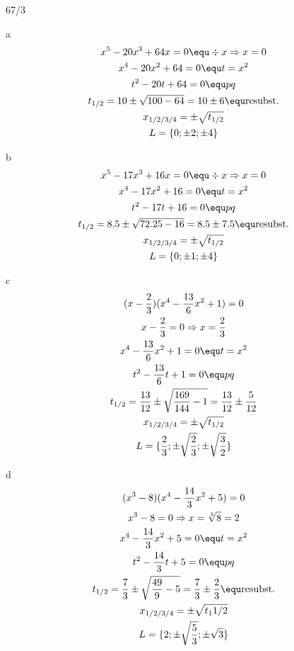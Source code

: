 \begin{exercise}{67/3}
  \item [a]
  \begin{gather*}
    x^5 - 20x^3 + 64x = 0 \equ \div x \Rightarrow x = 0 \\
    x^4 - 20x^2 + 64 = 0 \equ t = x^2 \\
    t^2 - 20t + 64 = 0 \equ pq \\
    t_{1/2} = 10 \pm \sqrt{100 - 64} = 10 \pm 6 \equ \text{resubst.} \\
    x_{1/2/3/4} = \pm \sqrt{t_{1/2}} \\
    L = \{0; \pm2; \pm4\}
  \end{gather*}
  \item [b]
  \begin{gather*}
    x^5 - 17x^3 + 16x = 0 \equ \div x \Rightarrow x = 0 \\
    x^4 - 17x^2 + 16 = 0 \equ t = x^2 \\
    t^2 - 17t + 16 = 0 \equ pq \\
    t_{1/2} = 8.5 \pm \sqrt{72.25 - 16} = 8.5 \pm 7.5 \equ \text{resubst.} \\
    x_{1/2/3/4} = \pm \sqrt{t_{1/2}} \\
    L = \{0; \pm1; \pm4\}
  \end{gather*}
  \item [c]
  \begin{gather*}
    (x - \frac{2}{3})(x^4 - \frac{13}{6}x^2 + 1) = 0 \\
    x - \frac{2}{3} = 0 \Rightarrow x = \frac{2}{3} \\
    x^4 - \frac{13}{6}x^2 + 1 = 0 \equ t = x^2 \\
    t^2 - \frac{13}{6}t + 1 = 0 \equ pq \\
    t_{1/2} = \frac{13}{12} \pm \sqrt{\frac{169}{144} - 1} = \frac{13}{12} \pm \frac{5}{12} \\
    x_{1/2/3/4} = \pm \sqrt{t_{1/2}} \\
    L = \{\frac{2}{3}; \pm \sqrt{\frac{2}{3}}; \pm \sqrt{\frac{3}{2}}\}
  \end{gather*}
  \item [d]
  \begin{gather*}
    (x^3 - 8)(x^4 - \frac{14}{3}x^2 + 5) = 0 \\
    x^3 - 8 = 0 \Rightarrow x = \sqrt[3]{8} = 2 \\
    x^4 - \frac{14}{3}x^2 + 5 = 0 \equ t = x^2 \\
    t^2 - \frac{14}{3}t + 5 = 0 \equ pq \\
    t_{1/2} = \frac{7}{3} \pm \sqrt{\frac{49}{9} - 5} = \frac{7}{3} \pm \frac{2}{3} \equ \text{resubst.} \\
    x_{1/2/3/4} = \pm \sqrt{t_1{1/2}} \\
    L = \{2; \pm \sqrt{\frac{5}{3}}; \pm \sqrt{3}\}
  \end{gather*}
\end{exercise}
